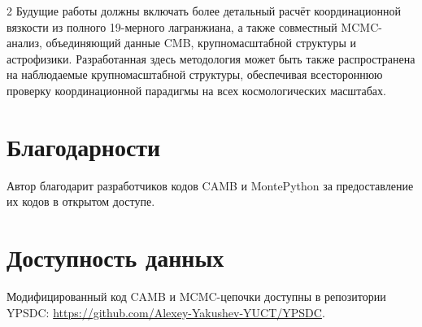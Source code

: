 \documentclass[11pt,a4paper]{article}
\begin{document}
\begin{multicols}{2}
		Будущие работы должны включать более детальный расчёт координационной вязкости из полного 19-мерного лагранжиана, а также совместный MCMC-анализ, объединяющий данные CMB, крупномасштабной структуры и астрофизики. Разработанная здесь методология может быть также распространена на наблюдаемые крупномасштабной структуры, обеспечивая всестороннюю проверку координационной парадигмы на всех космологических масштабах.
		
		\section*{Благодарности}
		
		Автор благодарит разработчиков кодов CAMB и MontePython за предоставление их кодов в открытом доступе.
		
		\section*{Доступность данных}
		
		Модифицированный код CAMB и MCMC-цепочки доступны в репозитории YPSDC: \url{https://github.com/Alexey-Yakushev-YUCT/YPSDC}.
		

\end{multicols}
\end{document}
